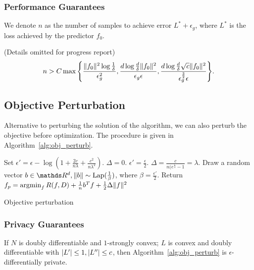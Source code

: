\documentclass{article} %
\begin{document}
\subsubsection{Performance Guarantees}
We denote $n$ as the number of samples to achieve error $L^* + \epsilon_g$, where $L^*$ is the loss achieved by the predictor $f_0$.

\begin{theorem} (Details omitted for progress report)
$$n > C\max{\left\{\frac{\norm{f_0}^2 \log{\frac{1}{\delta}}}{\epsilon_g^2}, \frac{d\log{\frac{d}{\delta}}\norm{f_0}^2}{\epsilon_g \epsilon}, \frac{d\log{\frac{d}{\delta}}\sqrt{c} \norm{f_0}^2}{\epsilon_g^{\frac{3}{2}}\epsilon}\right\}}.$$
\end{theorem}


\subsection{Objective Perturbation}
Alternative to perturbing the solution of the algorithm, we can also perturb the objective before optimization. The procedure is given in Algorithm~\ref{alg:obj_perturb}.

\begin{algorithm}[htb]
\begin{algorithmic}[1]
    \State Set $\epsilon' = \epsilon - \log{(1 + \frac{2c}{n\lambda} + \frac{c^2}{n\lambda^2})}$.
	\State $\Delta = 0$.
    \Else
	\State $\epsilon' = \frac{\epsilon}{2}$.
	\State $\Delta = \frac{c}{n(e^{\frac{\epsilon}{4}} - 1} = \lambda$.
    \EndIf
    \State Draw a random vector $b\in \R^d, \norm{b}\sim \text{Lap}(\frac{1}{\beta})$, where $\beta = \frac{\epsilon'}{2}$.
    \State Return $f_{p} = \argmin_f R(f, D) + \frac{1}{n} b^T f + \frac{1}{2}\Delta\norm{f}^2 $
   \EndFunction
\end{algorithmic}
\caption{Objective perturbation}\label{alg:obj_perturb}
\end{algorithm}

\subsubsection{Privacy Guarantees}
\begin{theorem}
If $N$ is doubly differentiable and $1$-strongly convex; $L$ is convex and doubly differentiable with $\abs*{L'} \le 1, \abs*{L''} \le c$, then Algorithm~\ref{alg:obj_perturb} is $\epsilon$-differentially private.
\end{theorem}
\end{document}
